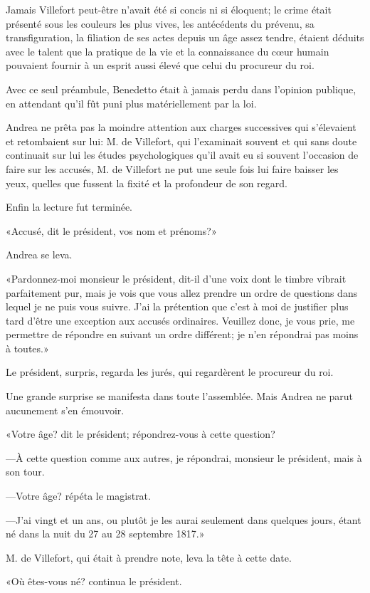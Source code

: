 Jamais Villefort peut-être n'avait été si concis ni si éloquent; le crime était présenté sous les couleurs les plus vives, les antécédents du prévenu, sa transfiguration, la filiation de ses actes depuis un âge assez tendre, étaient déduits avec le talent que la pratique de la vie et la connaissance du cœur humain pouvaient fournir à un esprit aussi élevé que celui du procureur du roi. 

Avec ce seul préambule, Benedetto était à jamais perdu dans l'opinion publique, en attendant qu'il fût puni plus matériellement par la loi. 

Andrea ne prêta pas la moindre attention aux charges successives qui s'élevaient et retombaient sur lui: M. de Villefort, qui l'examinait souvent et qui sans doute continuait sur lui les études psychologiques qu'il avait eu si souvent l'occasion de faire sur les accusés, M. de Villefort ne put une seule fois lui faire baisser les yeux, quelles que fussent la fixité et la profondeur de son regard. 

Enfin la lecture fut terminée. 

«Accusé, dit le président, vos nom et prénoms?» 

Andrea se leva. 

«Pardonnez-moi monsieur le président, dit-il d'une voix dont le timbre vibrait parfaitement pur, mais je vois que vous allez prendre un ordre de questions dans lequel je ne puis vous suivre. J'ai la prétention que c'est à moi de justifier plus tard d'être une exception aux accusés ordinaires. Veuillez donc, je vous prie, me permettre de répondre en suivant un ordre différent; je n'en répondrai pas moins à toutes.» 

Le président, surpris, regarda les jurés, qui regardèrent le procureur du roi. 

Une grande surprise se manifesta dans toute l'assemblée. Mais Andrea ne parut aucunement s'en émouvoir. 

«Votre âge? dit le président; répondrez-vous à cette question? 

—À cette question comme aux autres, je répondrai, monsieur le président, mais à son tour. 

—Votre âge? répéta le magistrat. 

—J'ai vingt et un ans, ou plutôt je les aurai seulement dans quelques jours, étant né dans la nuit du 27 au 28 septembre 1817.» 

M. de Villefort, qui était à prendre note, leva la tête à cette date. 

«Où êtes-vous né? continua le président. 

